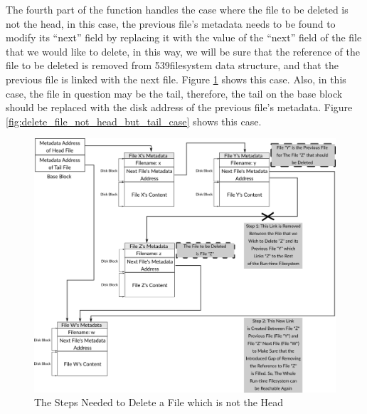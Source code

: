 The fourth part of the function handles the case where the file to be
deleted is not the head, in this case, the previous file's metadata
needs to be found to modify its ``next'' field by replacing it with the
value of the ``next'' field of the file that we would like to delete, in
this way, we will be sure that the reference of the file to be deleted
is removed from 539filesystem data structure, and that the previous file
is linked with the next file. Figure \ref{fig:delete_file_not_head_case}
shows this case. Also, in this case, the file in question may be the
tail, therefore, the tail on the base block should be replaced with the
disk address of the previous file's metadata. Figure
\ref{fig:delete_file_not_head_but_tail_case} shows this case.

\begin{figure}
\centering
\includegraphics[width=1.00000\textwidth]{Figures/filesystem-ch/delete_file_not_head_case.png}
\caption{The Steps Needed to Delete a File which is not the
Head}\label{fig:delete_file_not_head_case}
\end{figure}

